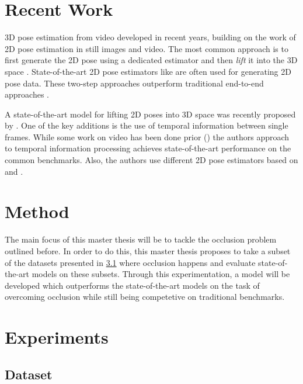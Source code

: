 \documentclass[twoside]{article}
\begin{document}
\begin{multicols}{2}
\section{Recent Work}
\label{sec:recent}
3D pose estimation from video developed in recent years, building on the work of 2D pose estimation in still images and video.
The most common approach is to first generate the 2D pose using a dedicated estimator and then \textit{lift} it into the 3D space \cite{pavllo_3d_2018}\cite{martinez_simple_2017}.
State-of-the-art 2D pose estimators like \cite{newell_stacked_2016}\cite{wei_convolutional_2016} are often used for generating 2D pose data.
These two-step approaches outperform traditional end-to-end approaches \cite{pavllo_3d_2018}.

A state-of-the-art model for lifting 2D poses into 3D space was recently proposed by \cite{pavllo_3d_2018}.
One of the key additions is the use of temporal information between single frames.
While some work on video has been done prior (\cite{lin_recurrent_nodate}\cite{hossain_exploiting_2018}) the authors approach to temporal information processing achieves state-of-the-art performance on the common benchmarks. 
Also, the authors use different 2D pose estimators based on \cite{he_mask_2017} and \cite{chen_cascaded_2018}.


\section{Method}

The main focus of this master thesis will be to tackle the occlusion problem outlined before.
In order to do this, this master thesis proposes to take a subset of the datasets presented in \ref{sec:dataset} where occlusion happens and evaluate state-of-the-art models on these subsets.
Through this experimentation, a model will be developed which outperforms the state-of-the-art models on the task of overcoming occlusion while still being competetive on traditional benchmarks.


\section{Experiments}
\subsection{Dataset}
\label{sec:dataset}


\end{multicols}
\end{document}

